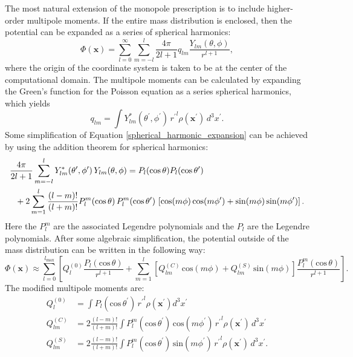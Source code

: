 \documentclass[12pt,preprint]{aastex}
\begin{document}
The most natural extension of the monopole prescription is to include higher-order multipole moments. If the entire mass distribution is enclosed, then the potential can be expanded as a series of spherical harmonics:
\begin{equation}
  \Phi(\mathbf{x}) = \sum_{l=0}^{\infty}\sum_{m=-l}^{l} \frac{4\pi}{2l + 1} q_{lm} \frac{Y_{lm}(\theta,\phi)}{r^{l+1}}, \label{spherical_harmonic_expansion}
\end{equation}
where the origin of the coordinate system is taken to be at the center of the computational domain. The multipole moments can be calculated by expanding the Green's function for the Poisson equation as a series spherical harmonics, which yields
\begin{equation}
  q_{lm} = \int Y^*_{lm}(\theta^\prime, \phi^\prime)\, {r^\prime}^l \rho(\mathbf{x}^\prime)\, d^3x^\prime. \label{multipole_moments_original}
\end{equation}
Some simplification of Equation \ref{spherical_harmonic_expansion} can be achieved by using the addition theorem for spherical harmonics:
\begin{align}
  &\frac{4\pi}{2l+1} \sum_{m=-l}^{l} Y^*_{lm}(\theta^\prime,\phi^\prime)\, Y_{lm}(\theta, \phi) = P_l(\text{cos}\, \theta) P_l(\text{cos}\, \theta^\prime) \notag \\
  &\ \ + 2 \sum_{m=1}^{l} \frac{(l-m)!}{(l+m)!} P_{l}^{m}(\text{cos}\, \theta)\, P_{l}^{m}(\text{cos}\, \theta^\prime)\, \left[\text{cos}(m\phi)\, \text{cos}(m\phi^\prime) + \text{sin}(m\phi)\, \text{sin}(m\phi^\prime)\right].
\end{align}
Here the $P_{l}^{m}$ are the associated Legendre polynomials and the $P_l$ are the Legendre polynomials. After some algebraic simplification, the potential outside of the mass distribution can be written in the following way:
\begin{equation}
  \Phi(\mathbf{x}) \approx \sum_{l=0}^{l_{\text{max}}} \left[Q_l^{(0)} \frac{P_l(\text{cos}\, \theta)}{r^{l+1}} + \sum_{m = 1}^{l}\left[ Q_{lm}^{(C)}\, \text{cos}(m\phi) + Q_{lm}^{(S)}\, \text{sin}(m\phi)\right] \frac{P_{l}^{m}(\text{cos}\, \theta)}{r^{l+1}} \right].
\end{equation}
The modified multipole moments are:
\begin{align}
  Q_l^{(0)}   &= \int P_l(\text{cos}\, \theta^\prime)\, {r^{\prime}}^l \rho(\mathbf{x}^\prime) d^3 x^\prime \\
  Q_{lm}^{(C)} &= 2\frac{(l-m)!}{(l+m)!} \int P_{l}^{m}(\text{cos}\, \theta^\prime)\, \text{cos}(m\phi^\prime)\, {r^\prime}^l \rho(\mathbf{x}^\prime)\, d^3 x^\prime \\
  Q_{lm}^{(S)} &= 2\frac{(l-m)!}{(l+m)!} \int P_{l}^{m}(\text{cos}\, \theta^\prime)\, \text{sin}(m\phi^\prime)\, {r^\prime}^l \rho(\mathbf{x}^\prime)\, d^3 x^\prime.
\end{align}
\end{document}
